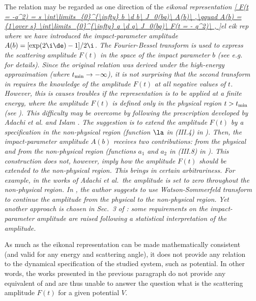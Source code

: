 The relation  may be regarded as one direction of the \em{eikonal representation}
\eqref{
	F(t = -q^2) = s \int\limits_{0}^{\infty} b \d b\ J_0(bq)\ A(b)\ ,\qquad
	A(b) = {1\over s} \int\limits_{0}^{\infty} q \d q\ J_0(bq)\ F(t = - q^2)\ ,
}{el eik rep}
where we have introduced the \em{impact-parameter amplitude} $A(b) = [\exp(2\i\de) - 1] / 2\i$.  The Fourier-Bessel transform is used to express the scattering amplitude $F(t)$ in the space of the impact parameter $b$ (see e.g.~ for details). Since the original relation  was derived under the high-energy approximation (where $t_{\rm min} \to -\infty$), it is not surprising that the second transform in  requires the knowledge of the amplitude $F(t)$ at all negative values of $t$. However, this is causes troubles if the representation is to be applied at a finite energy, where the amplitude $F(t)$ is defined only in the physical region $t > t_{\rm min}$ (see ). This difficulty may be overcome by following the prescription developed by Adachi et al.  and Islam . The suggestion is to extend the amplitude $F(t)$ by a specification in the non-physical region (function $\la$ in (III.4) in ). Then, the impact-parameter amplitude $A(b)$ receives two contributions: from the physical and from the non-physical region (functions $a_1$ and $a_2$ in (III.8) in ). This construction does not, however, imply how the amplitude $F(t)$ should be extended to the non-physical region. This brings in certain arbitrariness. For example, in the works of Adachi et al.~the amplitude is set to zero throughout the non-physical region. In , the author suggests to use Watson-Sommerfeld transform to continue the amplitude from the physical to the non-physical region. Yet another approach is chosen in Sec.~3 of : some requirements on the impact-parameter amplitude are raised following a statistical interpretation of the amplitude.

As much as the eikonal representation  can be made mathematically consistent (and valid for any energy and scattering angle), it does not provide any relation to the dynamical specification of the studied system, such as potential. In other words, the works presented in the previous paragraph do not provide any equivalent of  and are thus unable to answer the question what is the scattering amplitude $F(t)$ for a given potential $V$.

